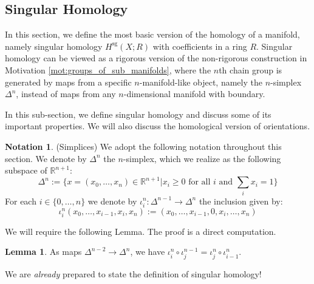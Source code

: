 \documentclass[12pt]{article}
\theoremstyle{definition}
\newtheorem{notation}[theorem]{Notation}
\numberwithin{equation}{section}
\newtheorem{lemma}[theorem]{Lemma}
\newcommand{\R}{{\mathbb R}}
\newcommand{\op}{\operatorname}
\begin{document}
\subsection{Singular Homology} \label{subsec:singular_homology} In this section, we define the most basic version of the homology of a manifold, namely singular homology $H^{\op{sg}}(X;R)$ with coefficients in a ring $R$. Singular homology can be viewed as a rigorous version of the non-rigorous construction in Motivation \ref{mot:groups_of_sub_manifolds}, where the $n$th chain group is generated by maps from a specific $n$-manifold-like object, namely the $n$-simplex $\Delta^n$, instead of maps from any $n$-dimensional manifold with boundary. 

In this sub-section, we define singular homology and discuss some of its important properties. We will also discuss the homological version of orientations.

\begin{notation} (Simplices) We adopt the following notation throughout this section. We denote by $\Delta^n$ the $n$-simplex, which we realize as the following subspace of $\R^{n+1}$:
\[
\Delta^n := \{x = (x_0,\dots,x_n) \in \R^{n+1}|x_i \ge 0 \text{ for all $i$ and }\sum_i x_i = 1\}
\]
For each $i \in \{0,\dots,n\}$ we denote by $\iota^n_i:\Delta^{n-1} \to \Delta^n$ the inclusion given by:
\[
\iota^n_i(x_0,\dots,x_{i-1},x_i,x_n) := (x_0,\dots,x_{i-1},0,x_i,\dots,x_n)
\]
\end{notation}

\noindent We will require the following Lemma. The proof is a direct computation.

\begin{lemma} \label{lem:simplex_inclusion} As maps $\Delta^{n-2} \to \Delta^n$, we have $\iota^n_i \circ \iota^{n-1}_j = \iota^n_j \circ \iota^n_{i-1}$.
\end{lemma}

We are \emph{already} prepared to state the definition of singular homology!
\end{document}
